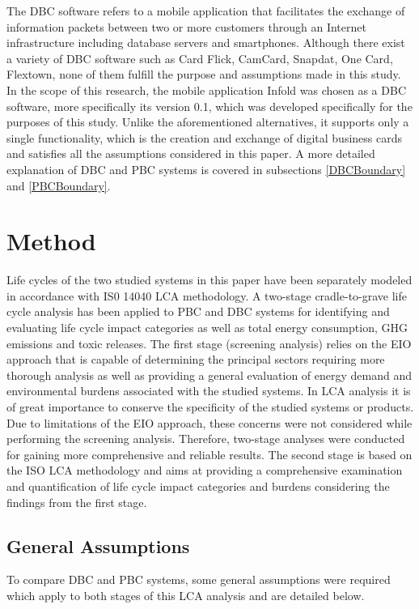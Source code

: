 \documentclass[3p,times,procedia]{elsarticle}
\begin{document}
The DBC software refers to a mobile application that facilitates the exchange of information packets between two or more customers through an Internet infrastructure including database servers and smartphones. Although there exist a variety of DBC software such as Card Flick, CamCard, Snapdat, One Card, Flextown, none of them fulfill the purpose and assumptions made in this study. In the scope of this research, the mobile application Infold was chosen as a DBC software, more specifically its version 0.1, which was developed specifically for the purposes of this study. Unlike the aforementioned alternatives, it supports only a single functionality, which is the creation and exchange of digital business cards and satisfies all the assumptions considered in this paper. A more detailed explanation of DBC and PBC systems is covered in subsections \ref{DBCBoundary} and \ref{PBCBoundary}.



\section{Method}

Life cycles of the two studied systems in this paper have been separately modeled in accordance with IS0 14040 LCA methodology. A two-stage cradle-to-grave life cycle analysis has been applied to PBC and DBC systems for identifying and evaluating life cycle impact categories as well as  total energy consumption, GHG emissions and toxic releases. The first stage (screening analysis) relies on the EIO approach that is capable of determining the principal sectors requiring more thorough analysis as well as providing a general evaluation of energy demand and environmental burdens associated with the studied systems. In LCA analysis it is of great importance to conserve the specificity of the studied systems or products. Due to limitations of the EIO approach, these concerns were not considered while performing the screening analysis. Therefore, two-stage analyses were conducted for gaining more comprehensive and reliable results. The second stage is based on the ISO LCA methodology and aims at providing a comprehensive examination and quantification of life cycle impact categories and burdens considering the findings from the first stage.

\subsection{General Assumptions}\label{Generalassume}
To compare DBC and PBC systems, some general assumptions were required which apply to both stages of this LCA analysis and are detailed below.
\end{document}
